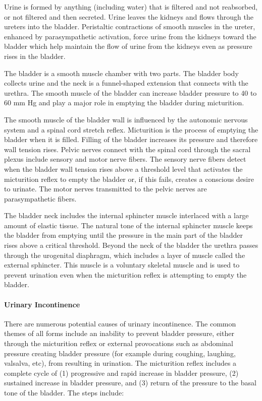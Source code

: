 Urine is formed by anything (including water) that is filtered and not reabsorbed, or not filtered and then secreted. Urine leaves the kidneys and flows through the ureters into the bladder. Peristaltic contractions of smooth muscles in the ureter, enhanced by parasympathetic activation, force urine from the kidneys toward the bladder which help maintain the flow of urine from the kidneys even as pressure rises in the bladder. 

The bladder is a smooth muscle chamber with two parts. The bladder body collects urine and the neck is a funnel-shaped extension that connects with the urethra. The smooth muscle of the bladder can increase bladder pressure to 40 to 60 mm Hg and play a major role in emptying the bladder during micturition.

The smooth muscle of the bladder wall is influenced by the autonomic nervous system and a spinal cord stretch reflex. Micturition is the process of emptying the bladder when it is filled. Filling of the bladder increases its pressure and therefore wall tension rises. Pelvic nerves connect with the spinal cord through the sacral plexus include sensory and motor nerve fibers. The sensory nerve fibers detect when the bladder wall tension rises above a threshold level that activates the micturition reflex to empty the bladder or, if this fails, creates a conscious desire to urinate. The motor nerves transmitted to the pelvic nerves are parasympathetic fibers.

The bladder neck includes the internal sphincter muscle interlaced with a large amount of elastic tissue. The natural tone of the internal sphincter muscle keeps the bladder from emptying until the pressure in the main part of the bladder rises above a critical threshold. Beyond the neck of the bladder the urethra passes through the urogenital diaphragm, which includes a layer of muscle called the external sphincter. This muscle is a voluntary skeletal muscle and is used to prevent urination even when the micturition reflex is attempting to empty the bladder.

\paragraph{Urinary Incontinence}

There are numerous potential causes of urinary incontinence. The common themes of all forms include an inability to prevent bladder pressure, either through the micturition reflex or external provocations such as abdominal pressure creating bladder pressure (for example during coughing, laughing, valsalva, etc), from resulting in urination. The micturition reflex includes a complete cycle of (1) progressive and rapid increase in bladder pressure, (2) sustained increase in bladder pressure, and (3) return of the pressure to the basal tone of the bladder. 
\vspace{4mm}
The steps include:

